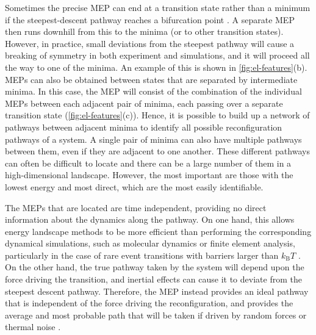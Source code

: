 Sometimes the precise MEP can end at a transition state rather than a minimum if the steepest-descent pathway reaches a bifurcation point \cite{Wales2004}.
A separate MEP then runs downhill from this to the minima (or to other transition states).
However, in practice, small deviations from the steepest pathway will cause a breaking of symmetry in both experiment and simulations, and it will proceed all the way to one of the minima.
An example of this is shown in \cref{fig:el-features}(b).
MEPs can also be obtained between states that are separated by intermediate minima.
In this case, the MEP will consist of the combination of the individual MEPs between each adjacent pair of minima, each passing over a separate transition state (\cref{fig:el-features}(c)).
Hence, it is possible to build up a network of pathways between adjacent minima to identify all possible reconfiguration pathways of a system.
A single pair of minima can also have multiple pathways between them, even if they are adjacent to one another.
These different pathways can often be difficult to locate and there can be a large number of them in a high-dimensional landscape.
However, the most important are those with the lowest energy and most direct, which are the most easily identifiable.

The MEPs that are located are time independent, providing no direct information about the dynamics along the pathway.
On one hand, this allows energy landscape methods to be more efficient than performing the corresponding dynamical simulations, such as molecular dynamics or finite element analysis, particularly in the case of rare event transitions with barriers larger than $k_\mathrm{B}T$ \cite{Passerone2001}.
On the other hand, the true pathway taken by the system will depend upon the force driving the transition, and inertial effects can cause it to deviate from the steepest descent pathway.
Therefore, the MEP instead provides an ideal pathway that is independent of the force driving the reconfiguration, and provides the average and most probable path that will be taken if driven by random forces or thermal noise \cite{E2007}.

